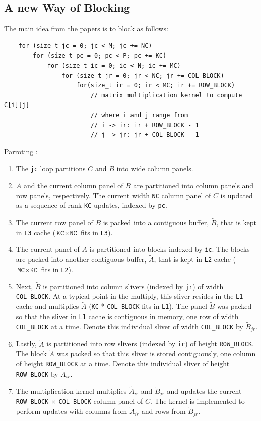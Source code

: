 \documentclass{article}
\begin{document}
\subsection{A new Way of Blocking}
\noindent The main idea from the papers is to block as follows:
\begin{lstlisting}
    for (size_t jc = 0; jc < M; jc += NC)
        for (size_t pc = 0; pc < P; pc += KC)
            for (size_t ic = 0; ic < N; ic += MC)
                for (size_t jr = 0; jr < NC; jr += COL_BLOCK)
                    for(size_t ir = 0; ir < MC; ir += ROW_BLOCK)
                        // matrix multiplication kernel to compute C[i][j]
                        // where i and j range from
                        // i -> ir: ir + ROW_BLOCK - 1
                        // j -> jr: jr + COL_BLOCK - 1
\end{lstlisting}
Parroting \cite{6877334}:
\begin{enumerate}
    \item The \texttt{jc} loop partitions $C$ and $B$ into wide column panels.
    \item $A$ and the current column panel of $B$ are partitioned into column panels and row panels, respectively.
    The current width \texttt{NC} column panel of $C$ is updated as a sequence of rank-\texttt{KC} updates, indexed by \texttt{pc}.
    \item The current row panel of $B$ is packed into a contiguous buffer, $\widetilde{B}$, that is kept in \texttt{L3} cache ($\texttt{KC} \times \texttt{NC}$ fits in \texttt{L3}).
    \item The current panel of $A$ is partitioned into blocks indexed by \texttt{ic}. The blocks are packed into another contiguous buffer, $\widetilde{A}$, that is kept in \texttt{L2} cache ($\texttt{MC} \times \texttt{KC}$ fits in \texttt{L2}).
    \item Next, $\widetilde{B}$ is partitioned into column slivers (indexed by \texttt{jr}) of width \texttt{COL\_BLOCK}. At a typical point in the multiply, this sliver resides in the \texttt{L1} cache and multiplies $\widetilde{A}$ (\texttt{KC} * \texttt{COL\_BLOCK} fits in \texttt{L1}). The panel 
    $\widetilde{B}$ was packed so that the sliver in \texttt{L1} cache is contiguous in memory, one row of width \texttt{COL\_BLOCK} at a time. Denote this individual sliver of width \texttt{COL\_BLOCK} by $\widetilde{B}_{jr}$.
    \item Lastly, $\widetilde{A}$ is partitioned into row slivers (indexed by \texttt{ir}) of height \texttt{ROW\_BLOCK}. The block $\widetilde{A}$ was packed so that this sliver is stored contiguously, one column of height \texttt{ROW\_BLOCK} at a time. 
    Denote this individual sliver of height \texttt{ROW\_BLOCK} by $\widetilde{A}_{ir}$.
    \item The multiplication kernel multiplies $\widetilde{A}_{ir}$ and $\widetilde{B}_{jr}$ and updates the current \texttt{ROW\_BLOCK} $\times$ \texttt{COL\_BLOCK} column panel of $C$. The kernel is implemented to perform updates with 
    columns from $\widetilde{A}_{ir}$ and rows from $\widetilde{B}_{jr}$.
\end{enumerate}
\end{document}
